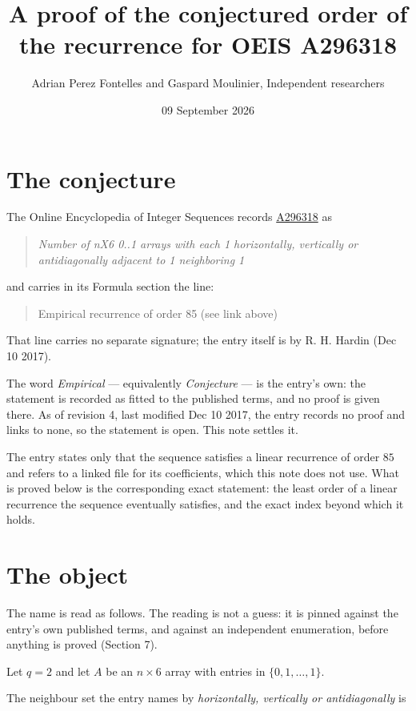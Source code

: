 \documentclass[11pt]{article}
\title{A proof of the conjectured order of the recurrence for OEIS A296318}
\author{Adrian Perez Fontelles and Gaspard Moulinier, Independent researchers}
\date{09 September 2026}
\theoremstyle{definition}
\begin{document}
\maketitle
\section{The conjecture}

The Online Encyclopedia of Integer Sequences records \href{https://oeis.org/A296318}{A296318} as

\begin{quote}\itshape Number of nX6 0..1 arrays with each 1 horizontally, vertically or antidiagonally adjacent to 1 neighboring 1\end{quote}

and carries in its Formula section the line:

\begin{quote}\ttfamily Empirical recurrence of order 85 (see link above)\end{quote}

That line carries no separate signature; the entry itself is by R. H. Hardin (Dec 10 2017).

The word {\itshape Empirical} --- equivalently {\itshape Conjecture} --- is the entry's own: the statement is recorded as fitted to the published terms, and no proof is given there. As of revision 4, last modified Dec 10 2017, the entry records no proof and links to none, so the statement is open. This note settles it.

The entry states only that the sequence satisfies a linear recurrence of order $85$ and refers to a linked file for its coefficients, which this note does not use. What is proved below is the corresponding exact statement: the least order of a linear recurrence the sequence eventually satisfies, and the exact index beyond which it holds.

\section{The object}

The name is read as follows. The reading is not a guess: it is pinned against the entry's own published terms, and against an independent enumeration, before anything is proved (Section 7).

Let $q = 2$ and let $A$ be an $n \times 6$ array with entries in $\{0,1,\dots,1\}$.

The neighbour set the entry names by {\itshape horizontally, vertically or antidiagonally} is
\end{document}
